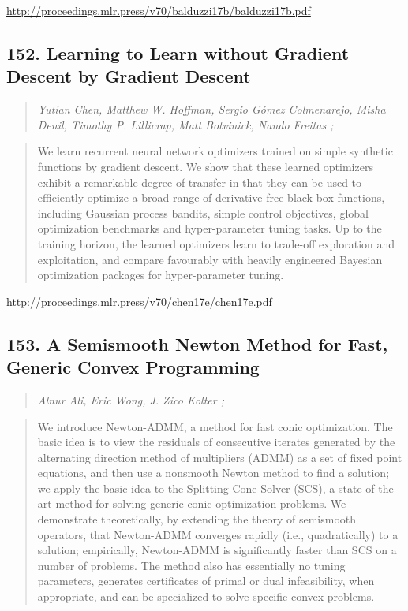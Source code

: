 \documentclass{article}
\begin{document}
\href{http://proceedings.mlr.press/v70/balduzzi17b/balduzzi17b.pdf}{http://proceedings.mlr.press/v70/balduzzi17b/balduzzi17b.pdf}

\subsection{152. Learning to Learn without Gradient Descent by Gradient Descent}

\begin{quote}
\footnotesize{\textit{Yutian Chen, Matthew W. Hoffman, Sergio Gómez Colmenarejo, Misha Denil, Timothy P. Lillicrap, Matt Botvinick, Nando Freitas ;}}
\end{quote}

\begin{quote}
    We learn recurrent neural network optimizers trained on simple synthetic functions by gradient descent. We show that these learned optimizers exhibit a remarkable degree of transfer in that they can be used to efficiently optimize a broad range of derivative-free black-box functions, including Gaussian process bandits, simple control objectives, global optimization benchmarks and hyper-parameter tuning tasks. Up to the training horizon, the learned optimizers learn to trade-off exploration and exploitation, and compare favourably with heavily engineered Bayesian optimization packages for hyper-parameter tuning.  \end{quote}

\href{http://proceedings.mlr.press/v70/chen17e/chen17e.pdf}{http://proceedings.mlr.press/v70/chen17e/chen17e.pdf}

\subsection{153. A Semismooth Newton Method for Fast, Generic Convex Programming}

\begin{quote}
\footnotesize{\textit{Alnur Ali, Eric Wong, J. Zico Kolter ;}}
\end{quote}

\begin{quote}
    We introduce Newton-ADMM, a method for fast conic optimization. The basic idea is to view the residuals of consecutive iterates generated by the alternating direction method of multipliers (ADMM) as a set of fixed point equations, and then use a nonsmooth Newton method to find a solution; we apply the basic idea to the Splitting Cone Solver (SCS), a state-of-the-art method for solving generic conic optimization problems. We demonstrate theoretically, by extending the theory of semismooth operators, that Newton-ADMM converges rapidly (i.e., quadratically) to a solution; empirically, Newton-ADMM is significantly faster than SCS on a number of problems. The method also has essentially no tuning parameters, generates certificates of primal or dual infeasibility, when appropriate, and can be specialized to solve specific convex problems.  \end{quote}
\end{document}
